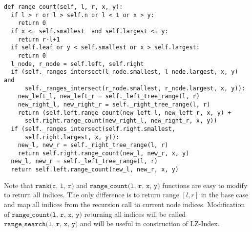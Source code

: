 \begin{verbatim}
def range_count(self, l, r, x, y):
  if l > r or l > self.n or l < 1 or x > y:
    return 0
  if x <= self.smallest  and self.largest <= y:
    return r-l+1
  if self.leaf or y < self.smallest or x > self.largest:
    return 0
  l_node, r_node = self.left, self.right
  if (self._ranges_intersect(l_node.smallest, l_node.largest, x, y) and
      self._ranges_intersect(r_node.smallest, r_node.largest, x, y)):
    new_left_l, new_left_r = self._left_tree_range(l, r)
    new_right_l, new_right_r = self._right_tree_range(l, r)
    return (self.left.range_count(new_left_l, new_left_r, x, y) +
      self.right.range_count(new_right_l, new_right_r, x, y))
  if (self._ranges_intersect(self.right.smallest,
      self.right.largest, x, y)):
    new_l, new_r = self._right_tree_range(l, r)
    return self.right.range_count(new_l, new_r, x, y)
  new_l, new_r = self._left_tree_range(l, r)
  return self.left.range_count(new_l, new_r, x, y)
\end{verbatim}

Note that $\texttt{rank(c, l, r)}$ and $\texttt{range\_count(l, r, x, y)}$ functions are easy to modify to return all indices. The only difference is to return range $[l, r]$ in the base case and map all indices from the recursion call to current node indices. Modification of $\texttt{range\_count(l, r, x, y)}$ returning all indices will be called $\texttt{range\_search(l, r, x, y)}$ and will be useful in construction of LZ-Index.